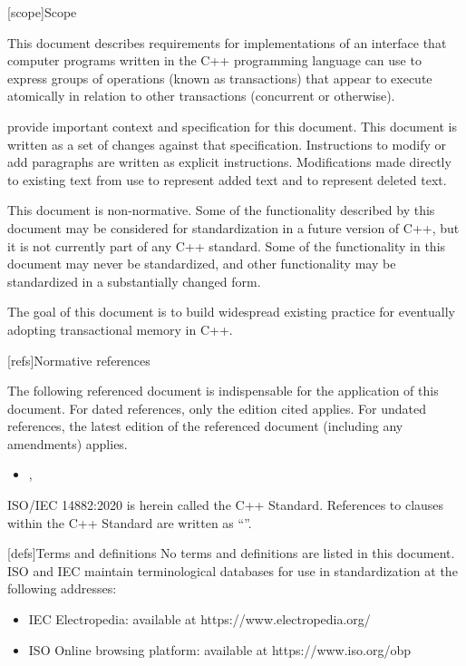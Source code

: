 
[scope]{Scope}

\pnum
This document describes requirements for implementations of an interface
that computer programs written in the C++ programming language
can use to express groups of
operations (known as transactions) that appear to execute atomically in
relation to other transactions (concurrent or otherwise).


\pnum
{\cppstddocno} provide important context and specification for
this document. This document is written as a set of changes against that specification.  Instructions to modify or add paragraphs are written as
explicit instructions.  Modifications made directly to existing text from {\cppstddocno} use  to represent added text and  to represent deleted text.

\pnum
This document is non-normative. Some of the functionality described by this document may be considered for standardization in a future version of C++, but it is not currently part of any C++ standard. Some of the functionality in this document may never be standardized, and other functionality may be standardized in a substantially changed form.

\pnum
The goal of this document is to build widespread existing practice for eventually adopting transactional memory in C++.

[refs]{Normative references}

\pnum
The following referenced document is indispensable for the application of this document. For dated references, only the edition cited applies. For undated references, the latest edition of the referenced document (including any amendments) applies.

\begin{itemize}
\item {\cppstddocno}, 
\end{itemize}

\pnum
ISO/IEC 14882:2020 is herein called the C++ Standard. References to clauses within the C++ Standard are written as ``''.


[defs]{Terms and definitions}
\pnum
{}%
No terms and definitions are listed in this document. ISO and IEC maintain
terminological databases for use in standardization at the following addresses:

\begin{itemize}
    \item IEC Electropedia: available at https://www.electropedia.org/
    \item ISO Online browsing platform: available at https://www.iso.org/obp
\end{itemize}

